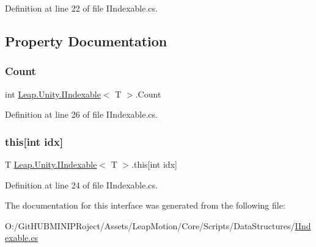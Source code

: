 Definition at line 22 of file I\+Indexable.\+cs.



\subsection{Property Documentation}
\mbox{\label{interface_leap_1_1_unity_1_1_i_indexable_a1f881d4965a67f3d717770fb6e546624}} 
\subsubsection{\texorpdfstring{Count}{Count}}
{\footnotesize\ttfamily int \mbox{\hyperlink{interface_leap_1_1_unity_1_1_i_indexable}{Leap.\+Unity.\+I\+Indexable}}$<$ T $>$.Count\hspace{0.3cm}{\ttfamily [get]}}



Definition at line 26 of file I\+Indexable.\+cs.

\mbox{\label{interface_leap_1_1_unity_1_1_i_indexable_a91008796a5e0ea8200a6f4fa226e1a50}} 
\subsubsection{\texorpdfstring{this[int idx]}{this[int idx]}}
{\footnotesize\ttfamily T \mbox{\hyperlink{interface_leap_1_1_unity_1_1_i_indexable}{Leap.\+Unity.\+I\+Indexable}}$<$ T $>$.this\mbox{[}int idx\mbox{]}\hspace{0.3cm}{\ttfamily [get]}}



Definition at line 24 of file I\+Indexable.\+cs.



The documentation for this interface was generated from the following file\+:\begin{DoxyCompactItemize}
\item 
O\+:/\+Git\+H\+U\+B\+M\+I\+N\+I\+P\+Roject/\+Assets/\+Leap\+Motion/\+Core/\+Scripts/\+Data\+Structures/\mbox{\hyperlink{_i_indexable_8cs}{I\+Indexable.\+cs}}\end{DoxyCompactItemize}
